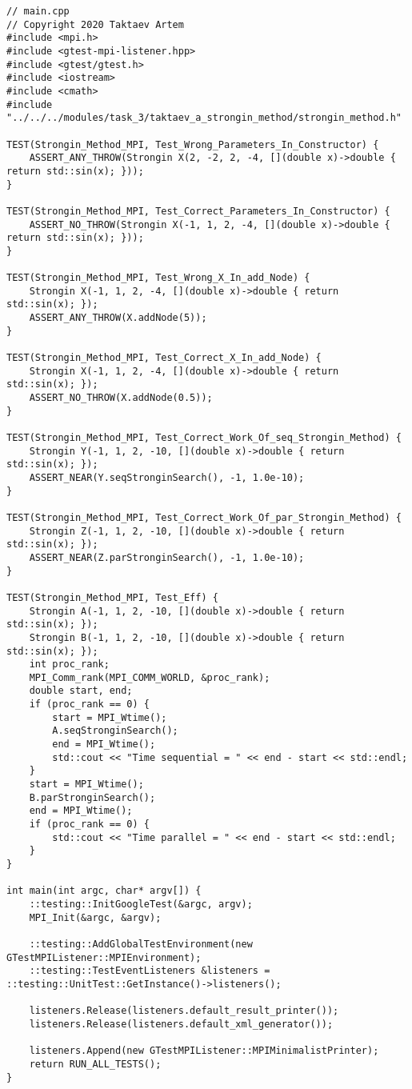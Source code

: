 \documentclass{report}
\begin{document}
\begin{lstlisting}
// main.cpp
// Copyright 2020 Taktaev Artem
#include <mpi.h>
#include <gtest-mpi-listener.hpp>
#include <gtest/gtest.h>
#include <iostream>
#include <cmath>
#include "../../../modules/task_3/taktaev_a_strongin_method/strongin_method.h"

TEST(Strongin_Method_MPI, Test_Wrong_Parameters_In_Constructor) {
    ASSERT_ANY_THROW(Strongin X(2, -2, 2, -4, [](double x)->double { return std::sin(x); }));
}

TEST(Strongin_Method_MPI, Test_Correct_Parameters_In_Constructor) {
    ASSERT_NO_THROW(Strongin X(-1, 1, 2, -4, [](double x)->double { return std::sin(x); }));
}

TEST(Strongin_Method_MPI, Test_Wrong_X_In_add_Node) {
    Strongin X(-1, 1, 2, -4, [](double x)->double { return std::sin(x); });
    ASSERT_ANY_THROW(X.addNode(5));
}

TEST(Strongin_Method_MPI, Test_Correct_X_In_add_Node) {
    Strongin X(-1, 1, 2, -4, [](double x)->double { return std::sin(x); });
    ASSERT_NO_THROW(X.addNode(0.5));
}

TEST(Strongin_Method_MPI, Test_Correct_Work_Of_seq_Strongin_Method) {
    Strongin Y(-1, 1, 2, -10, [](double x)->double { return std::sin(x); });
    ASSERT_NEAR(Y.seqStronginSearch(), -1, 1.0e-10);
}

TEST(Strongin_Method_MPI, Test_Correct_Work_Of_par_Strongin_Method) {
    Strongin Z(-1, 1, 2, -10, [](double x)->double { return std::sin(x); });
    ASSERT_NEAR(Z.parStronginSearch(), -1, 1.0e-10);
}

TEST(Strongin_Method_MPI, Test_Eff) {
    Strongin A(-1, 1, 2, -10, [](double x)->double { return std::sin(x); });
    Strongin B(-1, 1, 2, -10, [](double x)->double { return std::sin(x); });
    int proc_rank;
    MPI_Comm_rank(MPI_COMM_WORLD, &proc_rank);
    double start, end;
    if (proc_rank == 0) {
        start = MPI_Wtime();
        A.seqStronginSearch();
        end = MPI_Wtime();
        std::cout << "Time sequential = " << end - start << std::endl;
    }
    start = MPI_Wtime();
    B.parStronginSearch();
    end = MPI_Wtime();
    if (proc_rank == 0) {
        std::cout << "Time parallel = " << end - start << std::endl;
    }
}

int main(int argc, char* argv[]) {
    ::testing::InitGoogleTest(&argc, argv);
    MPI_Init(&argc, &argv);

    ::testing::AddGlobalTestEnvironment(new GTestMPIListener::MPIEnvironment);
    ::testing::TestEventListeners &listeners = ::testing::UnitTest::GetInstance()->listeners();

    listeners.Release(listeners.default_result_printer());
    listeners.Release(listeners.default_xml_generator());

    listeners.Append(new GTestMPIListener::MPIMinimalistPrinter);
    return RUN_ALL_TESTS();
}

\end{lstlisting}
\end{document}
